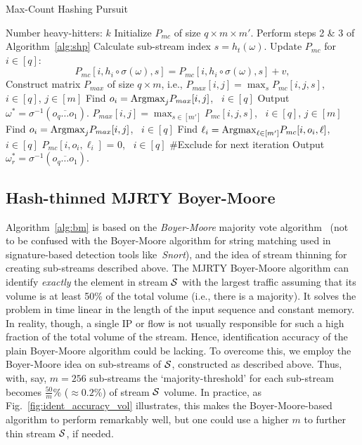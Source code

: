 \documentclass[10pt, conference, letterpaper,onecolumn]{IEEEtranv1.8}
\theoremstyle{plain}\newtheorem{thm}{Theorem}\newtheorem{lem}{Lemma}
\theoremstyle{definition}
\begin{document}
\setcounter{algorithm}{1}
\begin{algorithm}[t]
\caption{Max-Count Hashing Pursuit}
\label{alg:max-count}
\begin{algorithmic}[1]
\REQUIRE Number heavy-hitters: $k$
\STATE [Start]  Initialize  $P_{mc}$ of size $q\times m\times m'$.
\STATE Perform steps 2 \& 3 of Algorithm~\ref{alg:shp}
\STATE [Thin] Calculate sub-stream index $s=h_t(\omega)$.
\STATE [Update]    Update  $P_{mc}$ for $i \in [q]$:
   $$
    P_{mc}[i, h_i\circ \sigma(\omega), s] = P_{mc}[i,h_i\circ \sigma(\omega), s] + v, 
   $$
 \vspace{-10pt}  
	\STATE  Construct matrix $P_{max}$ of size $q\times m$, i.e.,
	 \STATE $P_{max}[i, j] = \max_{s} P_{mc}[i,j,s]$, \ $i\in[q]$, $j\in [m]$ 
	 \STATE Find $o_i = {\rm Argmax}_{j} P_{max}[i,j]$, \ $i\in[q]$ 
	 \STATE [decode]      Output $\omega^* = \sigma^{-1}(\overline{o_q \ldots o_1})$. 
 \ELSE
	 \STATE $P_{max}[i, j] = \max_{s\in [m']} P_{mc}[i,j,s]$, \ $i \in [q]$, $j \in [m]$ 
	 \STATE Find $o_i = {\rm Argmax}_{j} P_{max}[i,j]$, \ $i\in[q]$ 
	 \STATE Find $\ell_i = {\rm Argmax}_{\ell\in[m']} P_{mc}[i,o_i,\ell]$, \ $i\in[q]$  
	 \STATE $P_{mc}[i, o_i, \ell_i]$ = 0, \ $i\in[q]$  {\#Exclude for next iteration }
	 \STATE [decode]      Output $\omega_r^* = \sigma^{-1}(\overline{o_q \ldots o_1})$. 
  \ENDFOR
 \ENDIF 
 \ENDIF   
\end{algorithmic}
\end{algorithm} 
 
 
 
 


 \subsection{Hash-thinned MJRTY Boyer-Moore}
 \label{sec:bm}
 
 Algorithm~\ref{alg:bm} is based on the \emph{Boyer-Moore} majority vote algorithm~\cite{boyer_moore1991} (not
 to be confused with the Boyer-Moore algorithm for string matching  used in
 signature-based detection tools like~\emph{Snort}),
 and the idea of stream thinning for creating sub-streams described above. The
 MJRTY Boyer-Moore algorithm can identify \emph{exactly} the element
 in stream $\cal{S}$ with the largest traffic assuming that its volume is at least 50\% of the total volume (i.e., there is a majority).
 It solves the problem in time linear in the length of the input sequence and constant memory.
 In reality, though, a single IP or flow is not usually responsible for such a high fraction of the total volume of the stream. Hence,
 identification accuracy of the plain Boyer-Moore algorithm could be lacking. To overcome this, we employ the Boyer-Moore
 idea on sub-streams of $\cal{S}$, constructed as described above. Thus, with, say, $m=256$ sub-streams 
 the `majority-threshold' for each sub-stream becomes $\frac{50}{m}$\% ($\approx 0.2$\%) of  stream $\cal S$ volume. In practice, as Fig.~\ref{fig:ident_accuracy_vol} illustrates, this makes  the Boyer-Moore-based algorithm to perform remarkably well, but one could use a higher $m$ to further thin stream $\cal{S}$, if needed.  
 
\end{document}
